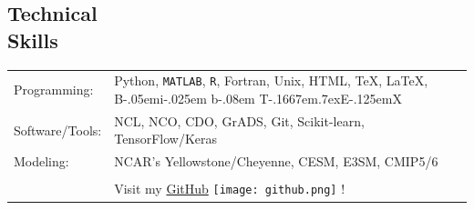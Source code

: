 \documentclass[margin,line,palatino,courier,10pt]{res}
\def\BibTeX{{\rm B\kern-.05em{\sc i\kern-.025em b}\kern-.08em
    T\kern-.1667em\lower.7ex\hbox{E}\kern-.125emX}}
\begin{document}
\begin{resume}
\section{\sc \textcolor{Cerulean}{\large{\textbf{Technical \\ Skills}}}}
\vspace*{0.05in}
\begin{tabular}{@{}p{0.9in}p{6in}}

Programming: & Python, \texttt{MATLAB}, \texttt{R}, Fortran, Unix, HTML, \TeX, \LaTeX, \BibTeX \\
Software/Tools: & NCL, NCO, CDO, GrADS, Git, Scikit-learn, TensorFlow/Keras\\
Modeling: & NCAR's Yellowstone/Cheyenne, CESM, E3SM, CMIP5/6\\\\

& Visit my \href{https://github.com/zmlabe}{GitHub} \texttt{[image: github.png]} !\\
\end{tabular}

\vspace{-0.1in}
\noindent\textcolor{Cerulean}{\makebox[\linewidth][r]{\rule{\textwidth}{5pt}}}
\vspace{-0.3in}


\end{resume}
\end{document}
